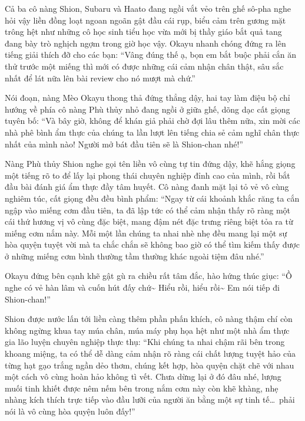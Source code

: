 \documentclass[../main.tex]{subfiles}
\begin{document}
Cả ba cô nàng Shion, Subaru và Haato đang ngồi vắt vẻo trên ghế sô-pha nghe hỏi vậy liền đồng loạt ngoan ngoãn gật đầu cái rụp, biểu cảm trên gương mặt trông hệt như những cô học sinh tiểu học vừa mới bị thầy giáo bắt quả tang đang bày trò nghịch ngợm trong giờ học vậy. Okayu nhanh chóng đứng ra lên tiếng giải thích đỡ cho các bạn: ``Vâng đúng thế ạ, bọn em bắt buộc phải cắn ăn thử trước một miếng thì mới có được những cái cảm nhận chân thật, sâu sắc nhất để lát nữa lên bài review cho nó mượt mà chứ.''

Nói đoạn, nàng Mèo Okayu thong thả đứng thẳng dậy, hai tay làm điệu bộ chỉ hướng về phía cô nàng Phù thủy nhỏ đang ngồi ở giữa ghế, dõng dạc cất giọng tuyên bố: ``Và bây giờ, không để khán giả phải chờ đợi lâu thêm nữa, xin mời các nhà phê bình ẩm thực của chúng ta lần lượt lên tiếng chia sẻ cảm nghĩ chân thực nhất của mình nào! Người mở bát đầu tiên sẽ là Shion-chan nhé!''

Nàng Phù thủy Shion nghe gọi tên liền vô cùng tự tin đứng dậy, khẽ hắng giọng một tiếng rõ to để lấy lại phong thái chuyên nghiệp đỉnh cao của mình, rồi bắt đầu bài đánh giá ẩm thực đầy tâm huyết. Cô nàng đanh mặt lại tỏ vẻ vô cùng nghiêm túc, cất giọng đều đều bình phẩm: ``Ngay từ cái khoảnh khắc răng ta cắn ngập vào miếng cơm đầu tiên, ta đã lập tức có thể cảm nhận thấy rõ ràng một cái thứ hương vị vô cùng đặc biệt, mang đậm nét đặc trưng riêng biệt tỏa ra từ miếng cơm nắm này. Mỗi một lần chúng ta nhai nhè nhẹ đều mang lại một sự hòa quyện tuyệt vời mà ta chắc chắn sẽ không bao giờ có thể tìm kiếm thấy được ở những miếng cơm bình thường tầm thường khác ngoài tiệm đâu nhé.''


Okayu đứng bên cạnh khẽ gật gù ra chiều rất tâm đắc, hào hứng thúc giục: ``Ồ nghe có vẻ hàn lâm và cuốn hút đấy chứ\~{} Hiểu rồi, hiểu rồi\~{} Em nói tiếp đi Shion-chan!''

Shion được nước lấn tới liền càng thêm phần phấn khích, cô nàng thậm chí còn không ngừng khua tay múa chân, múa máy phụ họa hệt như một nhà ẩm thực gia lão luyện chuyên nghiệp thực thụ: ``Khi chúng ta nhai chậm rãi bên trong khoang miệng, ta có thể dễ dàng cảm nhận rõ ràng cái chất lượng tuyệt hảo của từng hạt gạo trắng ngần dẻo thơm, chúng kết hợp, hòa quyện chặt chẽ với nhau một cách vô cùng hoàn hảo không tì vết. Chưa dừng lại ở đó đâu nhé, lượng muối tinh khiết được nêm nếm bên trong nắm cơm này còn khẽ khàng, nhẹ nhàng kích thích trực tiếp vào đầu lưỡi của người ăn bằng một sự tinh tế\dots\ phải nói là vô cùng hòa quyện luôn đấy!''
\end{document}
